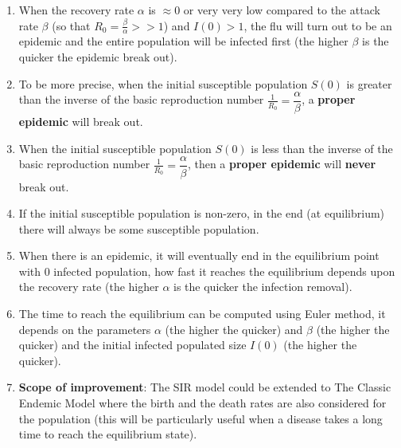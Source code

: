 \documentclass[11pt, a4paper, twoside]{report}
\begin{document}
\begin{enumerate}
\item When the recovery rate $\alpha$ is $\approx 0$ or very very low compared to the attack rate $\beta$ (so that $R_0=\frac{\beta}{\alpha} >> 1$) and $I(0) > 1$, the flu will turn out to be an epidemic and the entire population will be infected first (the higher $\beta$ is the quicker the epidemic break out). 
\item To be more precise, when the initial susceptible population $S(0)$ is greater than the inverse of the basic reproduction number $\frac{1}{R_0} = \dfrac{\alpha}{\beta}$, a \textbf{proper epidemic} will break out. 
\item When the initial susceptible population $S(0)$ is less than the inverse of the basic reproduction number $\frac{1}{R_0} = \dfrac{\alpha}{\beta}$, then a \textbf{proper epidemic} will \textbf{never} break out.
\item If the initial susceptible population is non-zero, in the end (at equilibrium) there will always be some susceptible population.
\item When there is an epidemic, it will eventually end in the equilibrium point with $0$ infected population, how fast it reaches the equilibrium depends upon the recovery rate (the higher $\alpha$ is the quicker the infection removal).
\item The time to reach the equilibrium can be computed using Euler method, it depends on the parameters $\alpha$ (the higher the quicker) and $\beta$ (the higher the quicker) and the initial infected populated size $I(0)$ (the higher the quicker).
\item \textbf{Scope of improvement}: The SIR model could be extended to The Classic Endemic Model \cite{bib:endemic} where the birth and the death rates are also considered for the population (this will be particularly useful when a disease takes a long time to reach the equilibrium state).
\end{enumerate}
\end{document}
